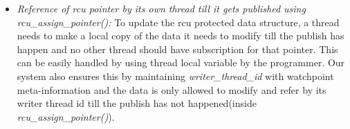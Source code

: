 \begin {itemize}
	\item \emph{ Reference of rcu pointer by its own thread till it gets published using \emph{rcu\_assign\_pointer()}:} To update the rcu protected data structure, a thread needs to make a local copy of the data it needs to modify till the publish has happen and no other thread should have subscription for that pointer. This can be easily handled by using thread local variable by the programmer. Our system also ensures this by maintaining \emph{writer\_thread\_id} with watchpoint meta-information and the data is only allowed to modify and refer by its writer thread id till the publish has not happened(inside \emph{rcu\_assign\_pointer()}).
\end{itemize}
